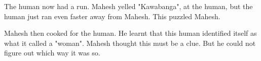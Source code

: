 The human now had a run. Mahesh yelled "Kawabanga", at the human, but the human just ran even faster away from Mahesh. This puzzled Mahesh.

Mahesh then cooked for the human. He learnt that this human identified itself as what it called a "woman". Mahesh thought this must be a clue. But he could not figure out which way it was so.
